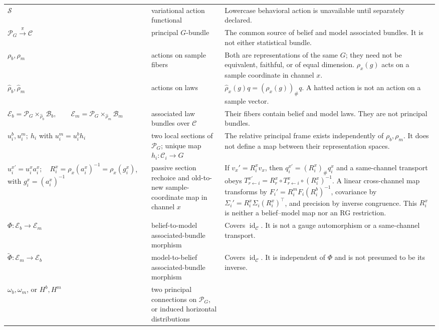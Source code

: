 \begin{longtable}{@{}>{\raggedright\arraybackslash}p{}
>{\raggedright\arraybackslash}p{}
>{\raggedright\arraybackslash}p{}@{}}
\(\mathscr S\) &
variational action functional &
Lowercase behavioral action is unavailable until separately declared. \\
\(\mathscr P_G\xrightarrow{\pi}\mathcal C\) &
principal \(G\)-bundle &
The common source of belief and model associated bundles. It is not either
statistical bundle. \\
\(\rho_b,\rho_m\) &
actions on sample fibers &
Both are representations of the same \(G\); they need not be equivalent,
faithful, or of equal dimension. \(\rho_x(g)\) acts on a sample coordinate in
channel \(x\). \\
\(\widehat\rho_b,\widehat\rho_m\) &
actions on laws &
\(\widehat\rho_x(g)q=(\rho_x(g))_\#q\).  A hatted action is not an action
on a sample vector. \\
\(\mathcal E_b=\mathscr P_G\times_{\widehat\rho_b}\mathcal B_b,\qquad
  \mathcal E_m=\mathscr P_G\times_{\widehat\rho_m}\mathcal B_m\) &
associated law bundles over \(\mathcal C\) &
Their fibers contain belief and model laws.  They are not principal
bundles. \\
\(u_i^b,u_i^m;\ h_i\) with \(u_i^m=u_i^b h_i\) &
two local sections of \(\mathscr P_G\); unique map \(h_i:\mathcal C_i\to G\) &
The relative principal frame exists independently of \(\rho_b,\rho_m\). It
does not define a map between their representation spaces. \\
\(u_i^{x\prime}=u_i^x a_i^x;\quad
R_i^x=\rho_x(a_i^x)^{-1}=\rho_x(g_i^x)\), with
\(g_i^x=(a_i^x)^{-1}\) &
passive section rechoice and old-to-new sample-coordinate map in channel \(x\) &
If \(v_x'=R_i^xv_x\), then \(q_i^{x\prime}=(R_i^x)_\#q_i^x\) and a
same-channel transport obeys
\(T_{r\leftarrow i}^{x\prime}
=R_r^x\circ T_{r\leftarrow i}^x\circ(R_i^x)^{-1}\).
A linear cross-channel map transforms by
\(F_i'=R_i^mF_i(R_i^b)^{-1}\), covariance by
\(\Sigma_i'=R_i^x\Sigma_i(R_i^x)^\top\), and precision by inverse
congruence.  This \(R_i^x\) is neither a belief--model map nor an RG
restriction. \\
\(\Phi:\mathcal E_b\to\mathcal E_m\) &
belief-to-model associated-bundle morphism &
Covers \(\operatorname{id}_{\mathcal C}\).  It is not a gauge
automorphism or a same-channel transport. \\
\(\widetilde\Phi:\mathcal E_m\to\mathcal E_b\) &
model-to-belief associated-bundle morphism &
Covers \(\operatorname{id}_{\mathcal C}\).  It is independent of \(\Phi\)
and is not presumed to be its inverse. \\
\(\omega_b,\omega_m\), or \(H^b,H^m\) &
two principal connections on \(\mathscr P_G\), or induced horizontal distributions &

\end{longtable}
